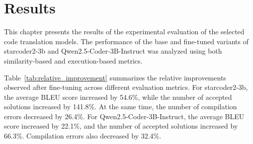 \chapter{Results}


This chapter presents the results of the experimental evaluation of the selected
code translation models. The performance of the base and fine-tuned variants of
starcoder2-3b and Qwen2.5-Coder-3B-Instruct was analyzed using both similarity-based and
execution-based metrics.

Table~\ref{tab:relative_improvement} summarizes the relative improvements
observed after fine-tuning across different evaluation metrics. For starcoder2-3b, the average BLEU score increased by 54.6\%, while the number
of accepted solutions increased by 141.8\%. At the same time, the number of
compilation errors decreased by 26.4\%. For Qwen2.5-Coder-3B-Instruct, the average BLEU score increased by 22.1\%, and
the number of accepted solutions increased by 66.3\%. Compilation errors also
decreased by 32.4\%.

\begin{table}[h]
\centering
\caption{Relative improvement after fine-tuning}
\end{table}




